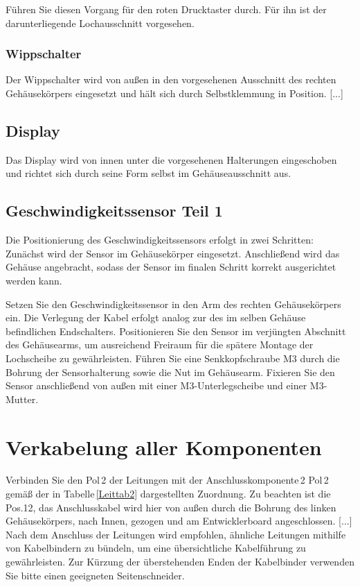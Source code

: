 Führen Sie diesen Vorgang für den roten Drucktaster durch. Für ihn ist der darunterliegende Lochausschnitt vorgesehen.

\subsection{Wippschalter}
Der Wippschalter wird von außen in den vorgesehenen Ausschnitt des rechten Gehäusekörpers eingesetzt und hält sich durch Selbstklemmung in Position. [...]

\section{Display}
Das Display wird von innen unter die vorgesehenen Halterungen eingeschoben und richtet sich durch seine Form selbst im Gehäuseausschnitt aus.

\section{Geschwindigkeitssensor Teil 1}
Die Positionierung des Geschwindigkeitssensors erfolgt in zwei Schritten: Zunächst wird der Sensor im Gehäusekörper eingesetzt. Anschließend wird das Gehäuse angebracht, sodass der Sensor im finalen Schritt korrekt ausgerichtet werden kann.

Setzen Sie den Geschwindigkeitssensor in den Arm des rechten Gehäusekörpers ein. Die Verlegung der Kabel erfolgt analog zur des im selben Gehäuse befindlichen Endschalters.
Positionieren Sie den Sensor im verjüngten Abschnitt des Gehäusearms, um ausreichend Freiraum für die spätere Montage der Lochscheibe zu gewährleisten. Führen Sie eine Senkkopfschraube M3 durch die Bohrung der Sensorhalterung sowie die Nut im Gehäusearm. Fixieren Sie den Sensor anschließend von außen mit einer M3-Unterlegscheibe und einer M3-Mutter.

\chapter{Verkabelung aller Komponenten}

Verbinden Sie den Pol 2 der Leitungen mit der Anschlusskomponente 2 Pol 2 gemäß der in Tabelle \ref{Leittab2} dargestellten Zuordnung. Zu beachten ist die Pos.12, das Anschlusskabel wird hier von außen durch die Bohrung des linken Gehäusekörpers, nach Innen, gezogen und am Entwicklerboard angeschlossen. [...]
Nach dem Anschluss der Leitungen wird empfohlen, ähnliche Leitungen mithilfe von Kabelbindern zu bündeln, um eine übersichtliche Kabelführung zu gewährleisten. Zur Kürzung der überstehenden Enden der Kabelbinder verwenden Sie bitte einen geeigneten Seitenschneider.

